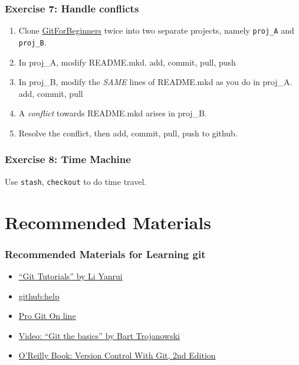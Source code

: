 \documentclass[11pt,ignorenonframetext,]{beamer}
\begin{document}
\begin{frame}[fragile]\frametitle{Exercise 7: Handle conflicts}

\begin{enumerate}[1.]
\item
  Clone
  \href{https://github.com/weijianwen/GitForBeginners}{GitForBeginners}
  twice into two separate projects, namely \texttt{proj\_A} and
  \texttt{proj\_B}.
\item
  In proj\_A, modify README.mkd. add, commit, pull, push
\item
  In proj\_B, modify the \emph{SAME} lines of README.mkd as you do in
  proj\_A. add, commit, pull
\item
  A \emph{conflict} towards README.mkd arises in proj\_B.
\item
  Resolve the conflict, then add, commit, pull, push to github.
\end{enumerate}
\end{frame}

\begin{frame}[fragile]\frametitle{Exercise 8: Time Machine}

Use \texttt{stash}, \texttt{checkout} to do time travel.

\end{frame}

\section{Recommended Materials}

\begin{frame}\frametitle{Recommended Materials for Learning git}

\begin{itemize}
\item
  \href{http://goo.gl/NBGgo}{``Git Tutorials'' by Li Yanrui}
\item
  \href{http://help.github.com/}{github:help}
\item
  \href{http://progit.org/book/}{Pro Git On line}
\item
  \href{http://excess.org/article/2008/07/ogre-git-tutorial/}{Video:
  ``Git the basics'' by Bart Trojanowski}
\item
  \href{http://shop.oreilly.com/product/0636920022862.do}{O'Reilly Book:
  Version Control With Git, 2nd Edition}
\end{itemize}
\end{frame}
\end{document}

